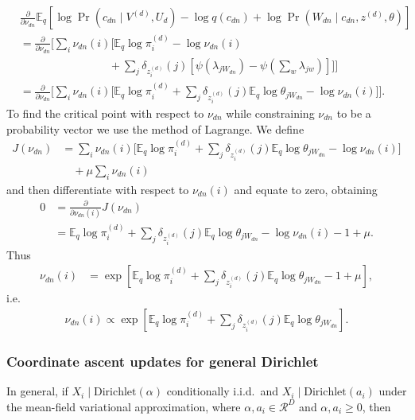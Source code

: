 \documentclass{article}
\newcommand{\Dirichlet}{\ensuremath{\mathrm{Dirichlet}}}
\newcommand{\R}{\ensuremath{\mathcal{R}}}
\newcommand{\digamma}[1]{\ensuremath{\psi\left(#1\right)}}
\newcommand{\Elogdirichlet}[2]{\ensuremath{\digamma{#1} - \digamma{#2}}}
\newcommand{\Eq}{\ensuremath{\mathbb{E}_q\xspace}}
\newcommand{\pd}[1]{\ensuremath{\frac{\partial}{\partial #1}}}
\begin{document}
\begin{align*}
    &\pd{\nu_{dn}} \Eq \left[ \log \Pr(c_{dn} \mid V^{(d)}, U_d) - \log q(c_{dn}) + \log \Pr(W_{dn} \mid c_{dn}, z^{(d)}, \theta) \right] \\
    &= \pd{\nu_{dn}} \Bigg[
        \sum_i \nu_{dn}(i) \Bigg[ \Eq \log \pi_i^{(d)} - \log \nu_{dn}(i) \\
        &\qquad\qquad\qquad\qquad + \sum_j \delta_{z_i^{(d)}}(j) \left[ \Elogdirichlet{\lambda_{j W_{dn}}}{\sum_w \lambda_{j w}} \right] \Bigg] \Bigg] \\
    &= \pd{\nu_{dn}} \Bigg[ \sum_i \nu_{dn}(i) \Bigg[ \Eq \log \pi_i^{(d)} + \sum_j \delta_{z_i^{(d)}}(j) \Eq \log \theta_{j W_{dn}} - \log \nu_{dn}(i) \Bigg] \Bigg] .
\end{align*}
To find the critical point with respect to $\nu_{dn}$ while constraining $\nu_{dn}$ to be a probability vector we use the method of Lagrange.  We define
\begin{align*}
    J(\nu_{dn}) &= \sum_i \nu_{dn}(i) \Bigg[ \Eq \log \pi_i^{(d)} + \sum_j \delta_{z_i^{(d)}}(j) \Eq \log \theta_{j W_{dn}} - \log \nu_{dn}(i) \Bigg] \\
    &\quad + \mu \sum_i \nu_{dn}(i)
\end{align*}
and then differentiate with respect to $\nu_{dn}(i)$ and equate to zero, obtaining
\begin{align*}
    0 &= \pd{\nu_{dn}(i)} J(\nu_{dn}) \\
      &= \Eq \log \pi_i^{(d)} + \sum_j \delta_{z_i^{(d)}}(j) \Eq \log \theta_{j W_{dn}} - \log \nu_{dn}(i) - 1 + \mu .
\end{align*}
Thus
\begin{align*}
    \nu_{dn}(i) &= \exp \left[ \Eq \log \pi_i^{(d)} + \sum_j \delta_{z_i^{(d)}}(j) \Eq \log \theta_{j W_{dn}} - 1 + \mu \right] ,
\end{align*}
i.e.
\begin{align*}
    \boxed{ \nu_{dn}(i) \propto \exp \left[ \Eq \log \pi_i^{(d)} + \sum_j \delta_{z_i^{(d)}}(j) \Eq \log \theta_{j W_{dn}} \right] }.
\end{align*}


\subsubsection*{Coordinate ascent updates for general Dirichlet}

In general, if $X_i \mid \Dirichlet(\alpha)$ conditionally i.i.d.\ and $X_i \mid \Dirichlet(a_i)$ under the mean-field variational approximation, where $\alpha, a_i \in \R^D$ and $\alpha, a_i \ge 0$, then
\end{document}
